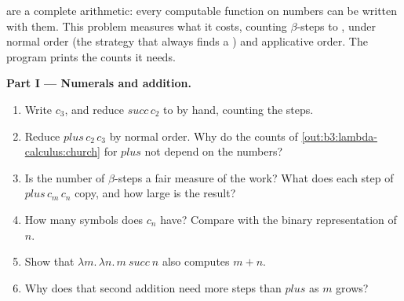 \begin{problem}\label{pb:b3:lambda-calculus:1}
 are a complete arithmetic: every computable function on numbers can be written with them. This problem measures what it costs, counting $\beta$-steps to , under normal order (the strategy that always finds a ) and applicative order. The program  prints the counts it needs.

\label{out:b3:lambda-calculus:pb}

\medskip\noindent\textbf{Part I --- Numerals and addition.}
\begin{enumerate}
\item Write $c_3$, and reduce $\mathit{succ}\,c_2$ to  by hand, counting the steps.
\item Reduce $\mathit{plus}\,c_2\,c_3$ by normal order. Why do the counts of \cref{out:b3:lambda-calculus:church} for $\mathit{plus}$ not depend on the numbers?
\item Is the number of $\beta$-steps a fair measure of the work? What does each step of $\mathit{plus}\,c_m\,c_n$ copy, and how large is the result?
\item How many symbols does $c_n$ have? Compare with the binary representation of $n$.
\item Show that $\lambda m.\,\lambda n.\,m\ \mathit{succ}\ n$ also computes $m + n$.
\item Why does that second addition need more steps than $\mathit{plus}$ as $m$ grows?
\end{enumerate}


\end{problem}
